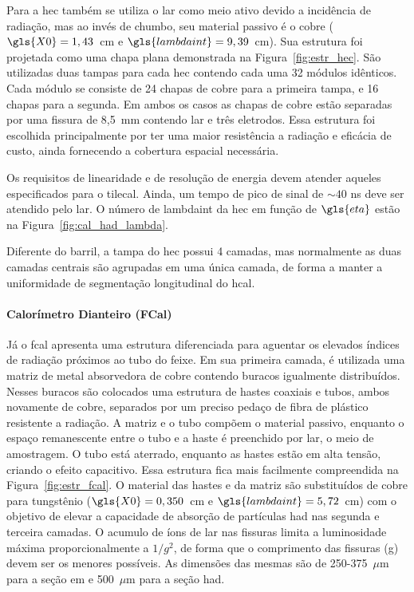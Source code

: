 Para a \gls{hec} também se utiliza o \gls{lar} como meio ativo devido a
incidência de radiação, mas ao invés de chumbo, seu material passivo é o cobre
($\gls{X0} = 1,43$~cm e $\gls{lambdaint}=9,39$~cm). 
Sua estrutura foi projetada como uma chapa plana 
demonstrada na Figura~\ref{fig:estr_hec}. São utilizadas duas tampas para cada
\gls{hec} contendo cada uma 32 módulos idênticos. Cada módulo se consiste de 24
chapas de cobre para a primeira tampa, e 16 chapas para a segunda. Em ambos os
casos as chapas de cobre estão separadas por uma fissura de 8,5~mm contendo
\gls{lar} e três eletrodos. Essa estrutura foi escolhida principalmente por ter
uma maior resistência a radiação e eficácia de custo, ainda fornecendo a
cobertura espacial necessária.

Os requisitos de linearidade e de resolução de energia devem atender aqueles
especificados para o \gls{tilecal}. Ainda, um tempo de pico de sinal
de $\sim40$ ns deve ser atendido pelo \gls{lar}. O número de \gls{lambdaint} da
\gls{hec} em função de $\gls{eta}$ estão na Figura~\ref{fig:cal_had_lambda}.

Diferente do barril, a tampa do \gls{hec}
possui 4 camadas, mas normalmente as duas camadas centrais são agrupadas em uma
única camada, de forma a manter a uniformidade de segmentação longitudinal do
\gls{hcal}.

\paragraph{Calorímetro Dianteiro (FCal)}
\label{par:cal_fcal}

Já o \gls{fcal} apresenta uma estrutura diferenciada
para aguentar os elevados índices de radiação próximos ao tubo do feixe. Em sua primeira camada, 
é utilizada uma matriz de metal absorvedora de cobre contendo buracos igualmente
distribuídos. Nesses buracos são colocados uma estrutura de hastes coaxiais e tubos, 
ambos novamente de cobre, separados por um preciso pedaço de fibra de plástico resistente
a radiação. A matriz e o tubo compõem o material passivo,
enquanto o espaço remanescente entre o tubo e a haste é preenchido por \gls{lar},
o meio de amostragem. O tubo está aterrado, enquanto as hastes estão em alta tensão, 
criando o efeito capacitivo.
Essa estrutura fica mais facilmente compreendida na Figura~\ref{fig:estr_fcal}. 
O material das hastes e da matriz são substituídos de cobre para tungstênio
($\gls{X0} = 0,350$~cm e $\gls{lambdaint} = 5,72$~cm) com 
o objetivo de elevar a capacidade de absorção de partículas \gls{had} nas segunda 
e terceira camadas. O acumulo de íons de \gls{lar} nas fissuras limita a
luminosidade máxima proporcionalmente a $1/g^2$, de forma que o comprimento das
fissuras (g) devem ser os menores possíveis. 
As dimensões das mesmas são de 250-375~$\mu$m para a seção \gls{em} 
e 500~$\mu$m para a seção \gls{had}.

